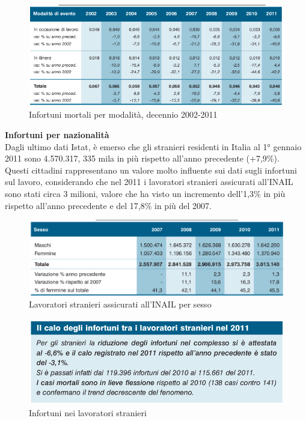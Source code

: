 \begin{figure}[H]
\centering
\includegraphics[scale=0.65]{images/analisiDiMercato/infortuniDecennioMortaliPerModalita2}
\caption{Infortuni mortali per modalità, decennio 2002-2011}
\end{figure}



\textbf{Infortuni per nazionalità}\\
Dagli ultimo dati Istat, è emerso che gli stranieri residenti in Italia al 1° gennaio 2011 sono
4.570.317, 335 mila in più rispetto all’anno precedente (+7,9\%).\\
Questi cittadini rappresentano un valore molto influente sui dati sugli infortuni sul lavoro, considerando che nel 2011 i lavoratori stranieri assicurati all’INAIL sono stati circa 3 milioni, valore che ha visto un incremento dell’1,3\% in più rispetto all'anno precedente e del 17,8\% in più del 2007.\\


\begin{figure}[H]
\centering
\includegraphics[scale=0.55]{images/analisiDiMercato/lavoratoriStranieri1}
\caption{Lavoratori stranieri assicurati all’INAIL per sesso}
\end{figure}

\begin{figure}[H]
\centering
\includegraphics[scale=0.55]{images/analisiDiMercato/lavoratoriStranieri2}
\caption{Infortuni nei lavoratori stranieri}
\end{figure}



